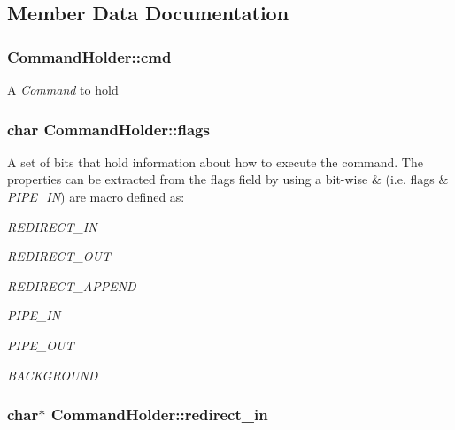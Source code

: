 \subsection{Member Data Documentation}
\hypertarget{structCommandHolder_a83a7e82024a6f736ffebed0792aa12a9}{
\subsubsection[{cmd}]{ Command\-Holder\-::cmd}}\label{structCommandHolder_a83a7e82024a6f736ffebed0792aa12a9}
A {\itshape \hyperlink{unionCommand}{Command}} to hold \hypertarget{structCommandHolder_acb381d6ab29bc574dc1ff452adc7847a}{
\subsubsection[{flags}]{\setlength{\rightskip}{0pt plus 5cm}char Command\-Holder\-::flags}}\label{structCommandHolder_acb381d6ab29bc574dc1ff452adc7847a}
A set of bits that hold information about how to execute the command. The properties can be extracted from the flags field by using a bit-\/wise \& (i.\-e. {\ttfamily flags} \& {\itshape P\-I\-P\-E\-\_\-\-I\-N}) are macro defined as\-:
\begin{DoxyItemize}
\item {\itshape R\-E\-D\-I\-R\-E\-C\-T\-\_\-\-I\-N} 
\item {\itshape R\-E\-D\-I\-R\-E\-C\-T\-\_\-\-O\-U\-T} 
\item {\itshape R\-E\-D\-I\-R\-E\-C\-T\-\_\-\-A\-P\-P\-E\-N\-D} 
\item {\itshape P\-I\-P\-E\-\_\-\-I\-N} 
\item {\itshape P\-I\-P\-E\-\_\-\-O\-U\-T} 
\item {\itshape B\-A\-C\-K\-G\-R\-O\-U\-N\-D} 
\end{DoxyItemize}\hypertarget{structCommandHolder_a3691bd22096644e8c6be327fc7d0d246}{
\subsubsection[{redirect\-\_\-in}]{\setlength{\rightskip}{0pt plus 5cm}char$\ast$ Command\-Holder\-::redirect\-\_\-in}}\label{structCommandHolder_a3691bd22096644e8c6be327fc7d0d246}
